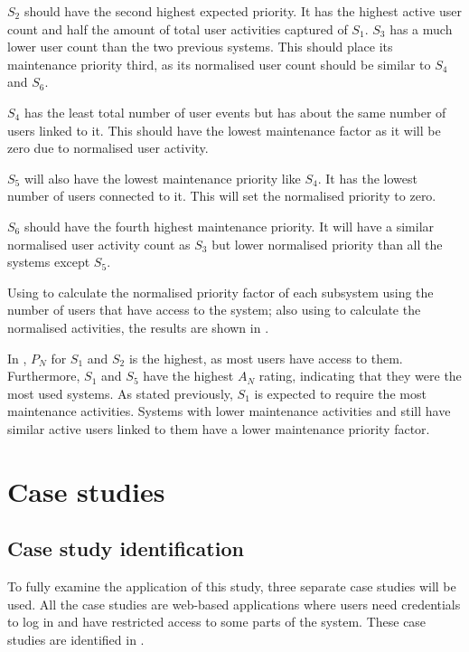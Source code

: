 $S_2$ should have the second highest expected priority. It has the highest active user count and half the amount of total user activities captured of $S_1$. $S_3$ has a much lower user count than the two previous systems. This should place its maintenance priority third, as its normalised user count should be similar to $S_4$ and $S_6$.\par $S_4$ has the least total number of user events but has about the same number of users linked to it. This should have the lowest maintenance factor as it will be zero due to normalised user activity. \par $S_5$ will also have the lowest maintenance priority like $S_4$. It has the lowest number of users connected to it. This will set the normalised priority to zero. \par $S_6$ should have the fourth highest maintenance priority. It will have a similar normalised user activity count as $S_3$ but lower normalised priority than all the systems except $S_5$. \par Using  to calculate the normalised priority factor of each subsystem using the number of users that have access to the system; also using  to calculate the normalised activities, the results are shown in .



In , $P_N$ for $S_1$ and $S_2$ is the highest, as most users have access to them. Furthermore, $S_1$ and $S_5$ have the highest $A_N$ rating, indicating that they were the most used systems. As stated previously, $S_1$ is expected to require the most maintenance activities. Systems with lower maintenance activities and still have similar active users linked to them have a lower maintenance priority factor.

\clearpage

\section{Case studies}\label{sec:ch3_caseStudies}

\subsection{Case study identification}
To fully examine the application of this study, three separate case studies will be used. All the case studies are web-based applications where users need credentials to log in and have restricted access to some parts of the system. These case studies are identified in .

